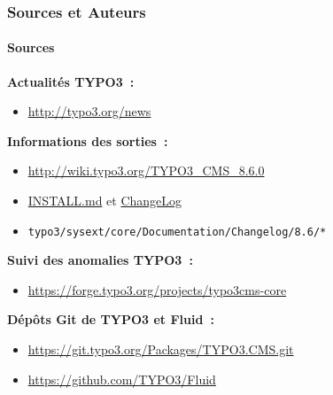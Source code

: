 \begin{frame}[fragile]
	\frametitle{Sources et Auteurs}
	\framesubtitle{Sources}

	\textbf{Actualités TYPO3~:}
		\begin{itemize}\smaller
			\item \url{http://typo3.org/news}
		\end{itemize}

	\textbf{Informations des sorties~:}
		\begin{itemize}\smaller
			\item \url{http://wiki.typo3.org/TYPO3_CMS_8.6.0}
			\item \href{https://github.com/TYPO3/TYPO3.CMS/blob/master/INSTALL.md}{INSTALL.md}
				et \href{https://github.com/TYPO3/TYPO3.CMS/tree/master/typo3/sysext/core/Documentation/Changelog}{ChangeLog}
			\item \texttt{typo3/sysext/core/Documentation/Changelog/8.6/*}
		\end{itemize}

	\textbf{Suivi des anomalies TYPO3~:}
		\begin{itemize}\smaller
			\item \url{https://forge.typo3.org/projects/typo3cms-core}
		\end{itemize}

	\textbf{Dépôts Git de TYPO3 et Fluid~:}
		\begin{itemize}\smaller
			\item \url{https://git.typo3.org/Packages/TYPO3.CMS.git}
			\item \url{https://github.com/TYPO3/Fluid}
		\end{itemize}

\end{frame}


